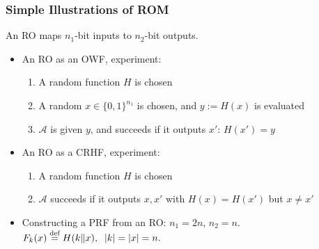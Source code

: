 \begin{frame}\frametitle{Simple Illustrations of ROM}
An RO maps $n_1$-bit inputs to $n_2$-bit outputs.
\begin{itemize}
\item An RO as an OWF, experiment:
\begin{enumerate}
\item A random function $H$ is chosen
\item A random $x \in \{0,1\}^{n_1}$ is chosen, and $y := H(x)$ is evaluated
\item $\mathcal{A}$ is given $y$, and succeeds if it outputs $x'$: $H(x')=y$
\end{enumerate}
\item An RO as a CRHF, experiment:
\begin{enumerate}
\item A random function $H$ is chosen
\item $\mathcal{A}$ succeeds if it outputs $x, x'$ with $H(x)=H(x')$ but $x\neq x'$
\end{enumerate}
\item Constructing a PRF from an RO: $n_1=2n$, $n_2=n$.
$ F_k(x) \overset{\text{def}}{=} H(k\| x),\;\; \lvert k\rvert=\lvert x\rvert=n.$
\end{itemize}
\end{frame}
